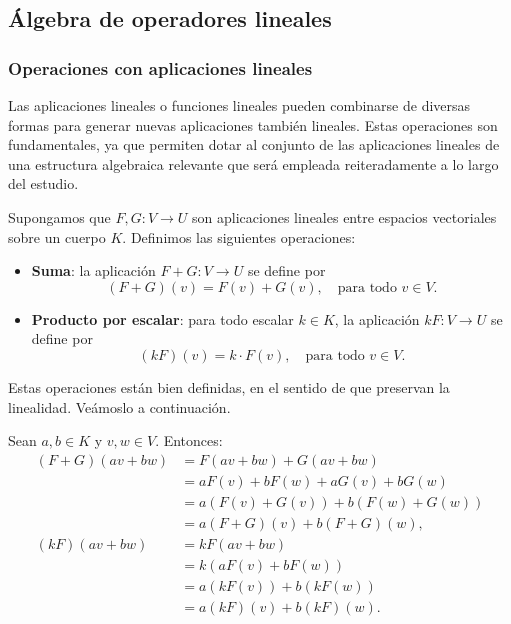 \subsection{Álgebra de operadores lineales}

\subsubsection{Operaciones con aplicaciones lineales}

Las aplicaciones lineales o funciones lineales pueden combinarse de diversas formas para generar nuevas aplicaciones también lineales. Estas operaciones son fundamentales, ya que permiten dotar al conjunto de las aplicaciones lineales de una estructura algebraica relevante que será empleada reiteradamente a lo largo del estudio.

Supongamos que \(F, G: V \to U\) son aplicaciones lineales entre espacios vectoriales sobre un cuerpo \(K\). Definimos las siguientes operaciones:

\begin{itemize}
  \item \textbf{Suma}: la aplicación \(F + G: V \to U\) se define por
  \[
    (F + G)(v) = F(v) + G(v), \quad \text{para todo } v \in V.
  \]

  \item \textbf{Producto por escalar}: para todo escalar \(k \in K\), la aplicación \(kF: V \to U\) se define por
  \[
    (kF)(v) = k \cdot F(v), \quad \text{para todo } v \in V.
  \]
\end{itemize}

Estas operaciones están bien definidas, en el sentido de que preservan la linealidad. Veámoslo a continuación.

Sean \(a, b \in K\) y \(v, w \in V\). Entonces:
\begin{align*}
  (F + G)(a v + b w) &= F(a v + b w) + G(a v + b w) \\
                     &= a F(v) + b F(w) + a G(v) + b G(w) \\
                     &= a(F(v) + G(v)) + b(F(w) + G(w)) \\
                     &= a (F + G)(v) + b (F + G)(w), \\[6pt]
  (kF)(a v + b w) &= k F(a v + b w) \\
                  &= k (a F(v) + b F(w)) \\
                  &= a (k F(v)) + b (k F(w)) \\
                  &= a (kF)(v) + b (kF)(w).
\end{align*}

